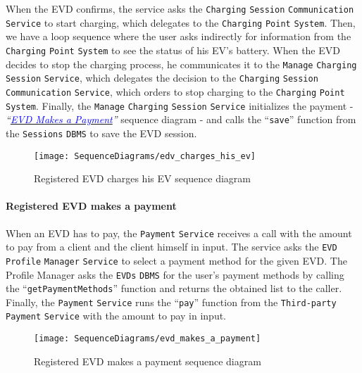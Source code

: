 When the EVD confirms, the service asks the \verb|Charging| \verb|Session| \verb|Communication| \verb|Service| to start charging, which delegates to the \verb|Charging| \verb|Point| \verb|System|.
Then, we have a loop sequence where the user asks indirectly for information from the \verb|Charging| \verb|Point| \verb|System| to see the status of his EV's battery.
When the EVD decides to stop the charging process, he communicates it to the \verb|Manage| \verb|Charging| \verb|Session| \verb|Service|, which delegates the decision to the \verb|Charging| \verb|Session| \verb|Communication| \verb|Service|, which orders to stop charging to the \verb|Charging| \verb|Point| \verb|System|.
Finally, the \verb|Manage| \verb|Charging| \verb|Session| \verb|Service| initializes the payment - \textit{``}\hyperlink{evdmakespayment}{\textcolor{blue}{\textit{EVD Makes a Payment}}}\textit{''} sequence diagram - and calls the ``\verb|save|'' function from the \verb|Sessions| \verb|DBMS| to save the EVD session.
\begin{figure}[H]
    \begin{center}
        \texttt{[image: SequenceDiagrams/edv\_charges\_his\_ev]}
        \caption{Registered EVD charges his EV sequence diagram}
        \label{fig:evd_charges_his_ev}
    \end{center}
\end{figure}

\paragraph{\texorpdfstring{\protect\hypertarget{evdmakespayment}{Registered EVD makes a payment}}{}}
When an EVD has to pay, the \verb|Payment| \verb|Service| receives a call with the amount to pay from a client and the client himself in input.
The service asks the \verb|EVD| \verb|Profile| \verb|Manager| \verb|Service| to select a payment method for the given EVD\@.
The Profile Manager asks the \verb|EVDs| \verb|DBMS| for the user's payment methods by calling the ``\verb|getPaymentMethods|'' function and returns the obtained list to the caller.
Finally, the \verb|Payment| \verb|Service| runs the ``\verb|pay|'' function from the \verb|Third-party| \verb|Payment| \verb|Service| with the amount to pay in input.
\begin{figure}[H]
    \begin{center}
        \texttt{[image: SequenceDiagrams/evd\_makes\_a\_payment]}
        \caption{Registered EVD makes a payment sequence diagram}
        \label{fig:evd_makes_payment}
    \end{center}
\end{figure}

